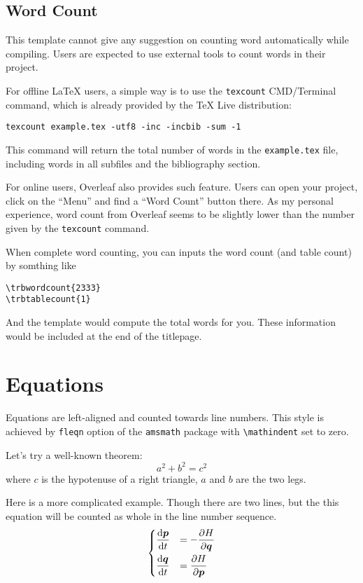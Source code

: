 \documentclass[12pt]{trbart}
\begin{document}
\subsection{Word Count}
This template cannot give any suggestion on counting word automatically while compiling. Users are expected to use external tools to count words in their project. 

For offline LaTeX users, a simple way is to use the \texttt{texcount} CMD/Terminal command, which is already provided by the TeX Live distribution:
\begin{verbatim}
texcount example.tex -utf8 -inc -incbib -sum -1 
\end{verbatim}
This command will return the total number of words in the \texttt{example.tex} file, including words in all subfiles and the bibliography section.

For online users, Overleaf also provides such feature. Users can open your project, click on the ``Menu'' and find a ``Word Count'' button there. As my personal experience, word count from Overleaf seems to be slightly lower than the number given by the \texttt{texcount} command.

When complete word counting, you can inputs the word count (and table count) by somthing like
\begin{verbatim}
\trbwordcount{2333}
\trbtablecount{1}
\end{verbatim}
And the template would compute the total words for you. These information would be included at the end of the titlepage.


\section{Equations}
Equations are left-aligned and counted towards line numbers. This style is achieved by \texttt{fleqn} option of the \texttt{amsmath} package with \verb+\mathindent+ set to zero. 

Let's try a well-known theorem:
\begin{equation}\label{eq:triangle}
    a^2 + b^2 = c^2
\end{equation}
where \(c\) is the hypotenuse of a right triangle, \(a\) and \(b\) are the two legs.

Here is a more complicated example. Though there are two lines, but the this equation will be counted as whole in the line number sequence.
\begin{equation}\label{eq:exp}
\begin{dcases}
    \frac{\mathop{}\negthinspace\mathrm{d} \boldsymbol{p}}{\mathop{}\negthinspace\mathrm{d} t} &= -\frac{\partial H}{\partial \boldsymbol{q}} \\
    \frac{\mathop{}\negthinspace\mathrm{d} \boldsymbol{q}}{\mathop{}\negthinspace\mathrm{d} t} &= \frac{\partial H}{\partial \boldsymbol{p}}
\end{dcases} 
\end{equation}
\end{document}
